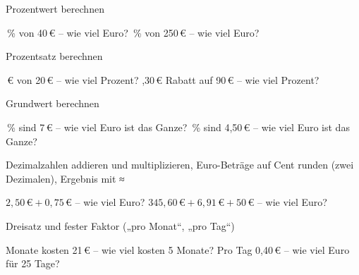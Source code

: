 \setcounter{aufgabe}{0}

\begin{aufgabe}{Prozentwert berechnen}
\begin{teile}
\,\% von 40\,€ – wie viel Euro? \leerfeld[€]
\,\% von 250\,€ – wie viel Euro? \leerfeld[€]
\end{teile}
\end{aufgabe}

\begin{aufgabe}{Prozentsatz berechnen}
\begin{teile}
\,€ von 20\,€ – wie viel Prozent? \leerfeld[\%]
,30\,€ Rabatt auf 90\,€ – wie viel Prozent? \leerfeld[\%]
\end{teile}
\end{aufgabe}

\begin{aufgabe}{Grundwert berechnen}
\begin{teile}
\,\% sind 7\,€ – wie viel Euro ist das Ganze? \leerfeld[€]
\,\% sind 4,50\,€ – wie viel Euro ist das Ganze? \leerfeld[€]
\end{teile}
\end{aufgabe}

\begin{aufgabe}{Dezimalzahlen addieren und multiplizieren, Euro-Beträge auf Cent runden (zwei Dezimalen), Ergebnis mit ≈}
\begin{teile}
\teil $2{,}50\,€ + 0{,}75\,€$ – wie viel Euro? \leerfeld[€]
\teil $345{,}60\,€ + 6{,}91\,€ + 50\,€$ – wie viel Euro? \leerfeld[€]
\end{teile}
\end{aufgabe}

\begin{aufgabe}{Dreisatz und fester Faktor („pro Monat“, „pro Tag“)}
\begin{teile}
 Monate kosten 21\,€ – wie viel kosten 5 Monate? \leerfeld[€]
\teil Pro Tag 0,40\,€ – wie viel Euro für 25 Tage? \leerfeld[€]
\end{teile}
\end{aufgabe}

